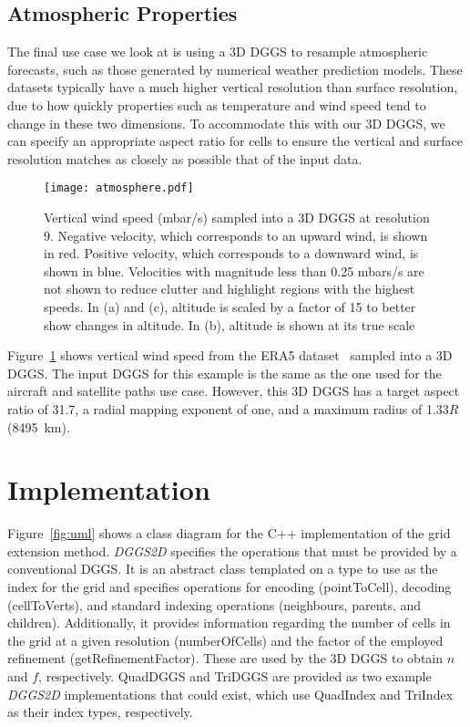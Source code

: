 \subsection{Atmospheric Properties}
The final use case we look at is using a 3D DGGS to resample atmospheric forecasts, such as those generated by numerical weather prediction models.
These datasets typically have a much higher vertical resolution than surface resolution, due to how quickly properties such as temperature and wind speed tend to change in these two dimensions.
To accommodate this with our 3D DGGS, we can specify an appropriate aspect ratio for cells to ensure the vertical and surface resolution matches as closely as possible that of the input data.


\begin{figure}[ht!]
	\centering
	\texttt{[image: atmosphere.pdf]}
	\caption[Atmospheric properties resampling use case showing vertical wind speed]{
		Vertical wind speed (mbar/s) sampled into a 3D DGGS at resolution 9.
		Negative velocity, which corresponds to an upward wind, is shown in red.
		Positive velocity, which corresponds to a downward wind, is shown in blue.
		Velocities with magnitude less than 0.25 mbars/s are not shown to reduce clutter and highlight regions with the highest speeds.
		In (a) and (c), altitude is scaled by a factor of 15 to better show changes in altitude.
		In (b), altitude is shown at its true scale
	}
	\label{fig:atmosphere}
\end{figure}


Figure~\ref{fig:atmosphere} shows vertical wind speed from the ERA5 dataset~\cite{era5} sampled into a 3D DGGS.
The input DGGS for this example is the same as the one used for the aircraft and satellite paths use case.
However, this 3D DGGS has a target aspect ratio of 31.7, a radial mapping exponent of one, and a maximum radius of 1.33$R$ (8495~km).


\section{Implementation} \label{chap:8:impl}
Figure~\ref{fig:uml} shows a class diagram for the C++ implementation of the grid extension method. \textit{DGGS2D} specifies the operations that must be provided by a conventional DGGS. It is an abstract class templated on a type to use as the index for the grid and specifies operations for encoding (pointToCell), decoding (cellToVerts), and standard indexing operations (neighbours, parents, and children). Additionally, it provides information regarding the number of cells in the grid at a given resolution (numberOfCells) and the factor of the employed refinement (getRefinementFactor). These are used by the 3D DGGS to obtain $n$ and $f$, respectively. QuadDGGS and TriDGGS are provided as two example \textit{DGGS2D} implementations that could exist, which use QuadIndex and TriIndex as their index types, respectively.


